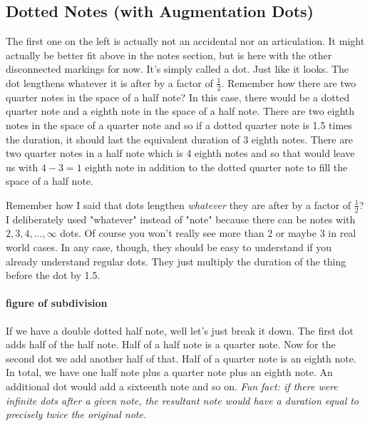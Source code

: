\documentclass[../OpenAppliedMusicTheory.tex]{subfiles}
\begin{document}
        \subsection{Dotted Notes (with Augmentation Dots)}
        The first one on the left is actually not an accidental nor an articulation. It might actually be better fit above in the notes section, but is here with the other disconnected markings for now. It's simply called a dot. Just like it looks. The dot lengthens whatever it is after by a factor of $\frac{1}{2}$. Remember how there are two quarter notes in the space of a half note? %
        In this case, there would be a dotted quarter note and a eighth note in the space of a half note. There are two eighth notes in the space of a quarter note and so if a dotted quarter note is 1.5 times the duration, it should last the equivalent duration of 3 eighth notes. There are two quarter notes in a half note which is 4 eighth notes and so that would leave us with $4-3=1$ eighth note in addition to the dotted quarter note to fill the space of a half note.

        Remember how I said that dots lengthen \emph{whatever} they are after by a factor of $\frac{1}{2}$? I deliberately used "whatever" instead of "note" because there can be notes with $2, 3, 4, \dots, \infty$ dots. Of course you won't really see more than 2 or maybe 3 in real world cases. In any case, though, they should be easy to understand if you already understand regular dots. They just multiply the duration of the thing before the dot by 1.5. 
        
        \paragraph{figure of subdivision} %

        If we have a double dotted half note, well let's just break it down. The first dot adds half of the half note. Half of a half note is a quarter note. Now for the second dot we add another half of that. Half of a quarter note is an eighth note. In total, we have one half note plus a quarter note plus an eighth note. An additional dot would add a sixteenth note and so on. \emph{Fun fact: if there were infinite dots after a given note, the resultant note would have a duration equal to precisely twice the original note.}

\end{document}
